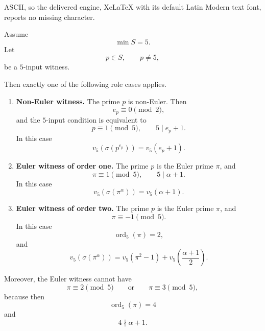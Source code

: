 \documentclass[10pt,a4paper]{amsart}
\DeclareMathOperator{\ord}{ord}
\begin{document}
ASCII, so the delivered engine, XeLaTeX with its default Latin Modern text font, reports no missing character.
\begin{lemma}
\label{lem:q5-first-input-classification}
Assume
\[
  \min S=5.
\]
Let
\[
  p\in S,\qquad p\ne5,
\]
be a $5$-input witness.

Then exactly one of the following role cases applies.

\begin{enumerate}[label=(\roman*),leftmargin=2.2em]

\item \textbf{Non-Euler witness.}
      The prime $p$ is non-Euler.  Then
      \[
        e_p\equiv0\pmod2,
      \]
      and the $5$-input condition is equivalent to
      \[
        p\equiv1\pmod5,
        \qquad
        5\mid e_p+1.
      \]
      In this case
      \[
        v_5(\sigma(p^{e_p}))=v_5(e_p+1).
      \]

\item \textbf{Euler witness of order one.}
      The prime $p$ is the Euler prime $\pi$, and
      \[
        \pi\equiv1\pmod5,
        \qquad
        5\mid \alpha+1.
      \]
      In this case
      \[
        v_5(\sigma(\pi^\alpha))=v_5(\alpha+1).
      \]

\item \textbf{Euler witness of order two.}
      The prime $p$ is the Euler prime $\pi$, and
      \[
        \pi\equiv-1\pmod5.
      \]
      In this case
      \[
        \ord_5(\pi)=2,
      \]
      and
      \[
        v_5(\sigma(\pi^\alpha))
        =
        v_5(\pi^2-1)
        +
        v_5\!\left(\frac{\alpha+1}{2}\right).
      \]
\end{enumerate}

Moreover, the Euler witness cannot have
\[
  \pi\equiv2\pmod5
  \qquad\text{or}\qquad
  \pi\equiv3\pmod5,
\]
because then
\[
  \ord_5(\pi)=4
\]
and
\[
  4\nmid \alpha+1.
\]
\end{lemma}
\end{document}
